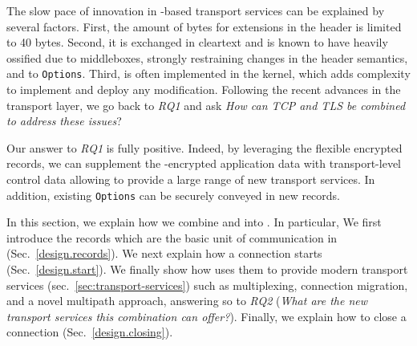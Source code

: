 


The slow pace of innovation in \tcp-based transport services can be explained by
several factors. First, the amount of bytes for extensions in the \tcp header is
limited to 40 bytes. Second, it is exchanged in cleartext and is known to have
heavily ossified due to middleboxes, strongly restraining changes in the header
semantics, and to \tcp \texttt{Options}. Third, \tcp is often implemented in the
kernel,  which adds complexity to implement and deploy any modification.
Following the recent advances in the transport layer, we go back to
{\small{\textit{RQ1}}} and ask \textit{How can TCP and TLS be combined to address these issues}?

Our answer to {\small{\textit{RQ1}}} is fully positive. Indeed, by leveraging the flexible encrypted \tls records, we can supplement the \tls-encrypted application data with transport-level control data allowing \tcpls to provide a large range of new transport services. In addition, existing \tcp \texttt{Options} can be securely conveyed in new \tls records. %


In this section, we explain how we combine \tcp and \tls into \tcpls. In particular, We first introduce the \tcpls records which are the basic unit of communication in \tcpls (Sec.~\ref{design.records}).  We next explain how a \tcpls connection starts (Sec.~\ref{design.start}). We finally show
how \tcpls uses them to provide modern transport services (sec.~\ref{sec:transport-services}) such as multiplexing, connection migration, and a novel multipath approach, answering so to {\small{\textit{RQ2}}} (\textit{What are the new transport services this combination can offer?}).  Finally, we explain how to close a \tcpls connection (Sec.~\ref{design.closing}).


